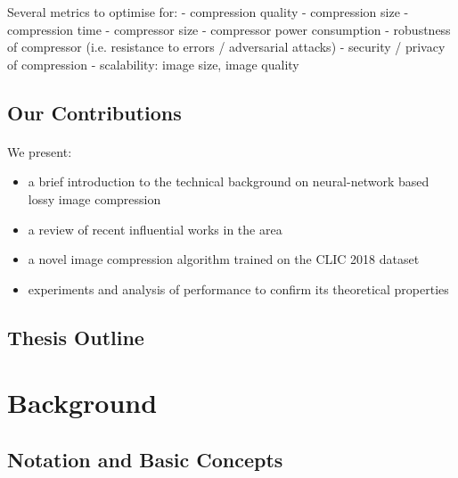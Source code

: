 \documentclass{article}
\begin{document}
Several metrics to optimise for:
- compression quality
- compression size
- compression time
- compressor size
- compressor power consumption
- robustness of compressor (i.e. resistance to errors / adversarial attacks)
- security / privacy of compression
- scalability: image size, image quality

\subsection{Our Contributions}
\paragraph{}

We present:
\begin{itemize}
\item a brief introduction to the technical background on neural-network
  based lossy image compression
\item a review of recent influential works in the area

\item a novel image compression algorithm trained on the CLIC 2018 dataset \cite{clic2018}

\item experiments and analysis of performance to confirm its theoretical properties
\end{itemize}

\subsection{Thesis Outline}
\paragraph{}

\section{Background}
\subsection{Notation and Basic Concepts}
\end{document}
